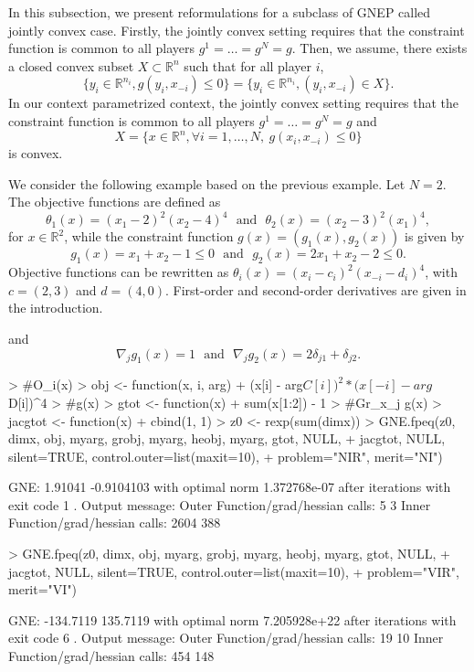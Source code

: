 \documentclass[11pt]{article}
\newcommand{\txtm}[1]{\textrm{~~#1~~}}
\newcommand{\R}{\ensuremath{\mathbb{R}}}
\begin{document}
In this subsection, we present reformulations for a subclass of GNEP called jointly convex case. 
Firstly, the jointly convex setting requires that the constraint function is common to all players $g^1=\dots =g^N= g$.
Then, we assume, there exists a closed convex subset $X \subset \R^n$ such that for all player $i$, 
$$
\{y_i \in \R^{n_i},  g(y_i, x_{-i}) \leq 0 \} 
=
\{y_i \in \R^{n_i},  (y_i, x_{-i}) \in X \} .  
$$ 
In our context parametrized context, the jointly convex setting requires that the constraint function is common to all players $g^1=\dots =g^N= g$ and
\begin{equation}
X= \{x \in \R^{n}, \forall i=1,\dots, N, ~ g(x_i, x_{-i}) \leq 0 \}
\label{eq:feasibleset:joint}
\end{equation}
is convex.



We consider the following example based on the previous example.
Let $N=2$. The objective functions are defined as
$$
\theta_1(x) = (x_1-2)^2 (x_2-4)^4 \txtm{and} \theta_2(x) = (x_2-3)^2 (x_1)^4,
$$
for $x\in \R^2$, while the constraint function $g(x)=(g_1(x), g_2(x))$ is given by
$$
g_1(x) = x_1+x_2-1 \leq 0 \txtm{and} g_2(x) = 2x_1+x_2-2 \leq 0.
$$
Objective functions can be rewritten as $\theta_i(x) = (x_i - c_i)^2 (x_{-i} - d_i)^4$, with $c = (2, 3)$ and
$d=(4,0)$.
First-order and second-order derivatives are given in the introduction. 


and
$$
\nabla_j g_1(x) = 1
\txtm{and}
\nabla_j g_2(x) = 2 \delta_{j1} + \delta_{j2}.
$$


\begin{Schunk}
\begin{Sinput}
> #O_i(x)
> obj <- function(x, i, arg)
+   (x[i] - arg$C[i])^2*(x[-i] - arg$D[i])^4
> #g(x)
> gtot <- function(x)
+   sum(x[1:2]) - 1
> #Gr_x_j g(x)
> jacgtot <- function(x)
+ 	cbind(1, 1)
> z0 <- rexp(sum(dimx))
> GNE.fpeq(z0, dimx, obj, myarg, grobj, myarg, heobj, myarg, gtot, NULL, 
+          jacgtot, NULL, silent=TRUE, control.outer=list(maxit=10), 
+          problem="NIR", merit="NI")
\end{Sinput}
\begin{Soutput}
GNE: 1.91041 -0.9104103 
with optimal norm 1.372768e-07 
after  iterations with exit code 1 .
Output message: 
Outer Function/grad/hessian calls: 5 3 
Inner Function/grad/hessian calls: 2604 388 
\end{Soutput}
\begin{Sinput}
> GNE.fpeq(z0, dimx, obj, myarg, grobj, myarg, heobj, myarg, gtot, NULL, 
+          jacgtot, NULL, silent=TRUE, control.outer=list(maxit=10), 
+          problem="VIR", merit="VI")
\end{Sinput}
\begin{Soutput}
GNE: -134.7119 135.7119 
with optimal norm 7.205928e+22 
after  iterations with exit code 6 .
Output message: 
Outer Function/grad/hessian calls: 19 10 
Inner Function/grad/hessian calls: 454 148 
\end{Soutput}
\end{Schunk}
\end{document}
